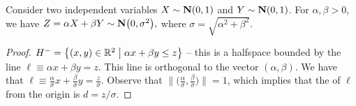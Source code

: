 \begin{lemma}
%
    Consider two independent variables $X \sim \NormalY{0}{1}$ and
    $Y \sim \NormalY{0}{1}$. For $\alpha,\beta > 0$, we have
    \begin{math}
        Z = \alpha X+\beta Y \sim \NormalY{ 0}{ \sigma^2},
    \end{math}
    where $\sigma = \sqrt{\alpha^2 + \beta^2}$.
\end{lemma}
\begin{proof}
    \newline
    $H^- = \left\{  (x,y)\in\mathbb{R}^2 \;\middle\vert\;  \alpha x + \beta y \leq z \right\}$ -- this
    is a halfspace bounded by the line
    $\ell \equiv \alpha x + \beta y = z $. This line is orthogonal to
    the vector $(\alpha,\beta)$. We have that
    $\ell \equiv \frac{\alpha}{\sigma} x + \frac{\beta}{\sigma} y =
    \frac{z}{\sigma} $. Observe that
    $\bigl\|\bigl( \frac{\alpha}{\sigma}, \frac{\beta}{\sigma}
    \bigr)\bigr\|=1$, which implies that the  of $\ell$ from
    the origin is $d = z/\sigma$.


\end{proof}
